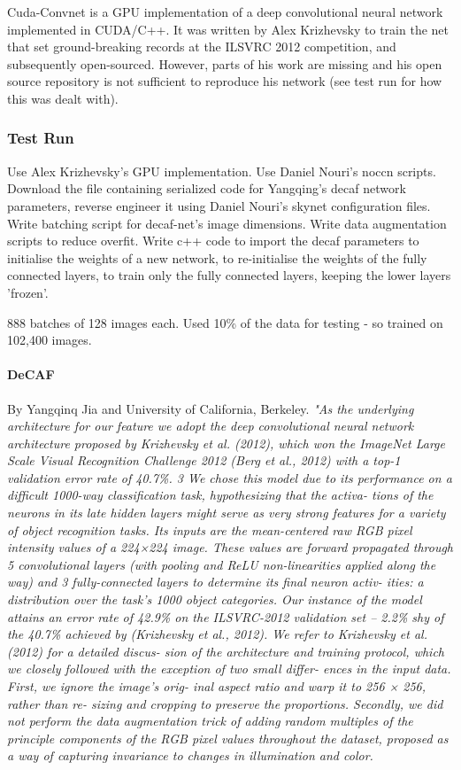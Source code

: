 \documentclass[a4paper,11pt]{article}
\begin{document}
Cuda-Convnet is a GPU implementation of a deep convolutional neural network implemented in CUDA/C++. It was written by Alex Krizhevsky to train the net that set ground-breaking records at the ILSVRC 2012 competition, and subsequently open-sourced. However, parts of his work are missing and his open source repository is not sufficient to reproduce his network (see test run for how this was dealt with).

\subsubsection{Test Run}

Use Alex Krizhevsky's GPU implementation. Use Daniel Nouri's noccn scripts. Download the file containing serialized code for Yangqing's decaf\cite{decaf} network parameters, reverse engineer it using Daniel Nouri's skynet configuration files. Write batching script for decaf-net's image dimensions. Write data augmentation scripts to reduce overfit.  Write c++ code to import the decaf parameters to initialise the weights of a new network, to re-initialise the weights of the fully connected layers, to train only the fully connected layers, keeping the lower layers 'frozen'.

888 batches of 128 images each. Used 10\% of the data for testing - so trained on 102,400 images.

\paragraph{DeCAF}

By Yangqinq Jia and University of California, Berkeley. \it{"As the underlying architecture for our feature we adopt the deep convolutional neural network architecture proposed by Krizhevsky et al. (2012), which won the ImageNet Large Scale Visual Recognition Challenge 2012 (Berg
et al., 2012) with a top-1 validation error rate of 40.7\%. 3 We chose this model due to its performance on a difficult 1000-way classification task, hypothesizing that the activa- tions of the neurons in its late hidden layers might serve as very strong features for a variety of object recognition tasks. Its inputs are the mean-centered raw RGB pixel intensity values of a 224×224 image. These values are forward propagated through 5 convolutional layers (with pooling and ReLU non-linearities applied along the way) and 3 fully-connected layers to determine its final neuron activ- ities: a distribution over the task’s 1000 object categories. Our instance of the model attains an error rate of 42.9\% on the ILSVRC-2012 validation set – 2.2\% shy of the 40.7\% achieved by (Krizhevsky et al., 2012).
We refer to Krizhevsky et al. (2012) for a detailed discus- sion of the architecture and training protocol, which we closely followed with the exception of two small differ- ences in the input data. First, we ignore the image’s orig-
inal aspect ratio and warp it to 256 × 256, rather than re- sizing and cropping to preserve the proportions. Secondly, we did not perform the data augmentation trick of adding random multiples of the principle components of the RGB pixel values throughout the dataset, proposed as a way of capturing invariance to changes in illumination and color.}
\end{document}
